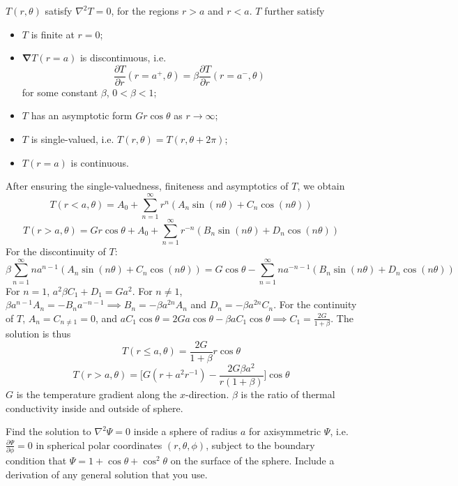\documentclass[a4paper]{article}
\begin{document}
\begin{ans}
$T(r,\theta)$ satisfy $\nabla^2T=0$, for the regions $r>a$ and $r<a$. $T$ further satisfy
\begin{itemize}
    \item $T$ is finite at $r=0$;
    \item $\boldsymbol{\nabla}T(r=a)$ is discontinuous, i.e.
    $$\frac{\partial T}{\partial r}(r=a^+,\theta)=\beta\frac{\partial T}{\partial r}(r=a^-,\theta)$$
    for some constant $\beta$, $0<\beta<1$;
    \item $T$ has an asymptotic form $Gr\cos\theta$ as $r\rightarrow\infty$;
    \item $T$ is single-valued, i.e. $T(r,\theta)=T(r,\theta+2\pi)$;
    \item $T(r=a)$ is continuous.
\end{itemize}
After ensuring the single-valuedness, finiteness and asymptotics of $T$, we obtain
$$T(r<a,\theta)=A_0+\sum_{n=1}^\infty r^n(A_n\sin(n\theta)+C_n\cos(n\theta))$$
$$T(r>a,\theta)=Gr\cos\theta+A_0+\sum_{n=1}^\infty r^{-n}(B_n\sin(n\theta)+D_n\cos(n\theta))$$
For the discontinuity of $T$:
$$\beta\sum_{n=1}^\infty na^{n-1}(A_n\sin(n\theta)+C_n\cos(n\theta))=G\cos\theta-\sum_{n=1}^\infty na^{-n-1}(B_n\sin(n\theta)+D_n\cos(n\theta))$$
For $n=1$, $a^2\beta C_1+D_1=Ga^2$. For $n\neq 1$, $\beta a^{n-1}A_n=-B_na^{-n-1}\implies B_n=-\beta a^{2n}A_n$ and $D_n=-\beta a^{2n}C_n$. For the continuity of $T$, $A_n=C_{n\neq1}=0$, and $aC_1\cos\theta=2Ga\cos\theta-\beta aC_1\cos\theta\implies C_1=\frac{2G}{1+\beta}$. The solution is thus
$$T(r\leq a,\theta)=\frac{2G}{1+\beta}r\cos\theta$$
$$T(r>a,\theta)=\bigg[G(r+a^2r^{-1})-\frac{2G\beta a^2}{r(1+\beta)}\bigg]\cos\theta$$
$G$ is the temperature gradient along the $x$-direction. $\beta$ is the ratio of thermal conductivity inside and outside of sphere.
\end{ans}
\newpage
\begin{qns}
Find the solution to $\nabla^2\Psi=0$ inside a sphere of radius $a$ for axisymmetric $\Psi$, i.e. $\frac{\partial\Psi}{\partial\phi}=0$ in spherical polar coordinates $(r,\theta,\phi)$, subject to the boundary condition that $\Psi=1+\cos\theta+\cos^2\theta$ on the surface of the sphere. Include a derivation of any general solution that you use.
\end{qns}
\end{document}
